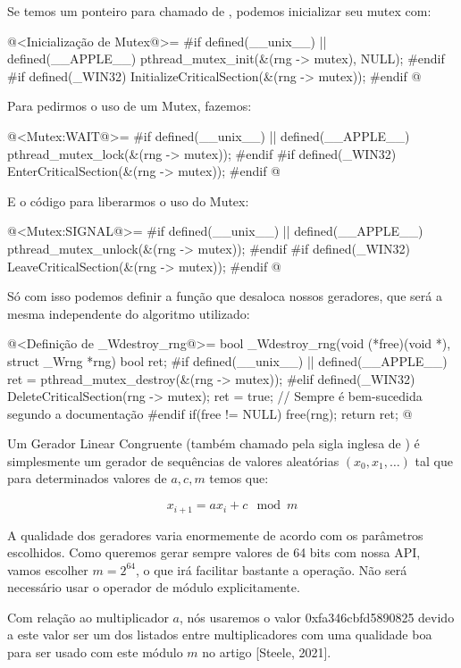 Se temos um ponteiro para  chamado
de , podemos inicializar seu mutex com:

\iniciocodigo
@<Inicialização de Mutex@>=
#if defined(__unix__) || defined(__APPLE__)
pthread_mutex_init(&(rng -> mutex), NULL);
#endif
#if defined(_WIN32)
InitializeCriticalSection(&(rng -> mutex));
#endif
@
\fimcodigo

Para pedirmos o uso de um Mutex, fazemos:

\iniciocodigo
@<Mutex:WAIT@>=
#if defined(__unix__) || defined(__APPLE__)
pthread_mutex_lock(&(rng -> mutex));
#endif
#if defined(_WIN32)
EnterCriticalSection(&(rng -> mutex));
#endif
@
\fimcodigo

E o código para liberarmos o uso do Mutex:

\iniciocodigo
@<Mutex:SIGNAL@>=
#if defined(__unix__) || defined(__APPLE__)
pthread_mutex_unlock(&(rng -> mutex));
#endif
#if defined(_WIN32)
LeaveCriticalSection(&(rng -> mutex));
#endif
@
\fimcodigo

Só com isso podemos definir a função que desaloca nossos geradores,
que será a mesma independente do algoritmo utilizado:

\iniciocodigo
@<Definição de \_Wdestroy\_rng@>=
bool _Wdestroy_rng(void (*free)(void *), struct _Wrng *rng){
  bool ret;
#if defined(__unix__) || defined(__APPLE__)
  ret = pthread_mutex_destroy(&(rng -> mutex));
#elif defined(_WIN32)
  DeleteCriticalSection(rng -> mutex);
  ret = true; // Sempre é bem-sucedida segundo a documentação
#endif
  if(free != NULL)
    free(rng);
  return ret;
}
@
\fimcodigo



Um Gerador Linear Congruente (também chamado pela sigla inglesa
de ) é simplesmente um gerador de
sequências de valores aleatórias $(x_0, x_1, \ldots)$ tal que para
determinados valores de $a, c, m$ temos que:

$$
x_{i+1}=ax_i+c \mod m
$$

A qualidade dos geradores varia enormemente de acordo com os
parâmetros escolhidos. Como queremos gerar sempre valores de 64 bits
com nossa API, vamos escolher $m=2^{64}$, o que irá facilitar bastante
a operação. Não será necessário usar o operador de módulo
explicitamente.

Com relação ao multiplicador $a$, nós usaremos o valor
0xfa346cbfd5890825 devido a este valor ser um dos listados entre
multiplicadores com uma qualidade boa para ser usado com este módulo
$m$ no artigo [Steele, 2021].


